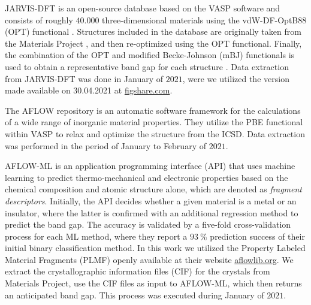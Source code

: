 \documentclass[superscriptaddress,unsortedaddress,
 amsmath,amssymb,
 aps,
]{revtex4-2}
\begin{document}
JARVIS-DFT \cite{Choudhary2020} is an open-source database based on the VASP software and consists of roughly $40.000$ three-dimensional materials using the vdW-DF-OptB88 (OPT) functional \cite{Thonhauser2007, Klimes2011}. Structures included in the database are originally taken from the Materials Project \cite{Jain2013, Jain2018}, and then re-optimized using the OPT functional. Finally, the combination of the OPT and modified Becke-Johnson (mBJ) functionals \cite{Tran2009} is used to obtain a representative band gap for each structure \cite{Choudhary2018a}. Data extraction from JARVIS-DFT was done in January of $2021$, were we utilized the version made available on 30.04.2021 at \url{figshare.com}.

The AFLOW \cite{Curtarolo2012, Curtarolo2012a, Calderon2015} repository is an automatic software framework for the calculations of a wide range of inorganic material properties. They utilize the PBE functional within VASP to relax and optimize the structure from the ICSD. Data extraction was performed in the period of January to February of $2021$.

AFLOW-ML \cite{Isayev2017} is an application programming interface (API) that uses machine learning to predict thermo-mechanical and electronic properties based on the chemical composition and atomic structure alone, which are denoted as \textit{fragment descriptors}. Initially, the API decides whether a given material is a metal or an insulator, where the latter is confirmed with an additional regression method to predict the band gap. The accuracy is validated by a five-fold cross-validation process for each ML method, where they report a $93 \ \%$ prediction success of their initial binary classification method. In this work we utilized the Property Labeled Material Fragments (PLMF) openly available at their website \url{aflowlib.org}. We extract the crystallographic information files (CIF) for the crystals from Materials Project, use the CIF files as input to AFLOW-ML, which then returns an anticipated band gap. This process was executed during January of $2021$. 
\end{document}
